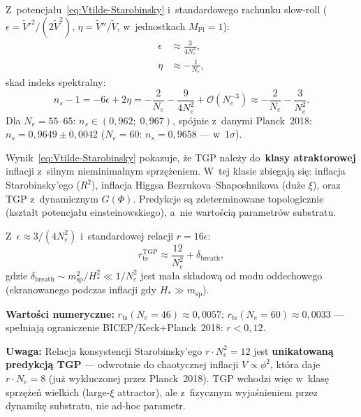 \begin{proposition}%
\label{prop:spectral-index}
Z~potencja\l{}u~\eqref{eq:Vtilde-Starobinsky} i~standardowego
rachunku slow-roll ($\epsilon = \tilde{V}'^2/(2\tilde{V}^2)$,
$\eta = \tilde{V}''/\tilde{V}$, w~jednostkach $M_\mathrm{Pl}=1$):
\begin{align}
    \epsilon &\approx \frac{3}{4N_e^2},
    \label{eq:epsilon-TGP}\\
    \eta &\approx -\frac{1}{N_e},
    \label{eq:eta-TGP}
\end{align}
skad indeks spektralny:
\begin{equation}\label{eq:spectral-index}
    n_s - 1 = -6\epsilon + 2\eta
    = -\frac{2}{N_e} - \frac{9}{4N_e^2} + \mathcal{O}(N_e^{-3})
    \approx -\frac{2}{N_e} - \frac{3}{N_e^2}.
\end{equation}
Dla $N_e = 55$--$65$: $n_s \in (0{,}962;\;0{,}967)$,
sp\'ojnie z~danymi Planck~2018: $n_s = 0{,}9649 \pm 0{,}0042$
($N_e=60$: $n_s = 0{,}9658$ --- w~$1\sigma$).
\end{proposition}

\begin{remark}\label{rem:universality}
Wynik~\eqref{eq:Vtilde-Starobinsky} pokazuje, \.ze TGP nale\.zy
do~\textbf{klasy atraktorowej} inflacji z~silnym nieminimalnym
sprz\k{e}\.zeniem. W~tej klasie zbiegaj\k{a} si\k{e}: inflacja
Starobinsky'ego ($R^2$), inflacja Higgsa Bezrukova--Shaposhnikova
(du\.ze $\xi$), oraz TGP z~dynamicznym $G(\Phi)$.
Predykcje s\k{a} zdeterminowane topologicznie (kszta\l{}t potencja\l{}u
einsteinowskiego), a~nie warto\'sci\k{a} parametr\'ow substratu.
\end{remark}

\begin{proposition}\label{prop:r-tensor}
Z~$\epsilon \approx 3/(4N_e^2)$ i~standardowej relacji $r = 16\epsilon$:
\begin{equation}\label{eq:r-ts-TGP}
    r_\mathrm{ts}^{\mathrm{TGP}}
    \approx \frac{12}{N_e^2} + \delta_\mathrm{breath},
\end{equation}
gdzie $\delta_\mathrm{breath} \sim m_\mathrm{sp}^2/H_*^2 \ll 1/N_e^2$
jest ma\l{}a sk\l{}adow\k{a} od modu oddechowego (ekranowanego
podczas inflacji gdy $H_* \gg m_\mathrm{sp}$).

\textbf{Warto\'sci numeryczne:}
$r_\mathrm{ts}(N_e=46) \approx 0{,}0057$;
$r_\mathrm{ts}(N_e=60) \approx 0{,}0033$
--- spe\l{}niaj\k{a} ograniczenie BICEP/Keck+Planck~2018: $r < 0{,}12$.

\textbf{Uwaga:} Relacja konsystencji Starobinsky'ego $r \cdot N_e^2 = 12$
jest \textbf{unikatowan\k{a} predykcj\k{a} TGP} --- odwrotnie do
chaotycznej inflacji $V \propto \phi^2$, kt\'ora daje
$r \cdot N_e = 8$ (ju\.z wykluczonej przez Planck~2018).
TGP wchodzi wi\k{e}c w~klas\k{e} sprz\k{e}\.ze\'n wielkich
(large-$\xi$ attractor), ale z~fizycznym wyja\'snieniem
przez dynamik\k{e} substratu, nie ad-hoc parametr.
\end{proposition}

